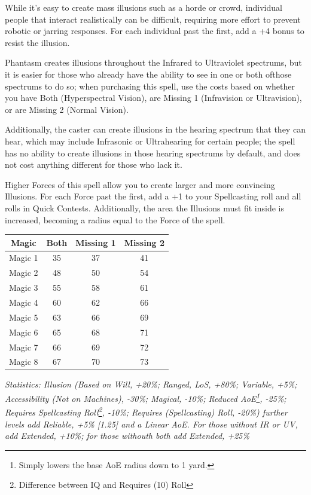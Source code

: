 \begin{multicols}{3}
	While it's easy to create mass illusions such as a horde or crowd, individual people that interact realistically can be difficult, requiring more effort to prevent robotic or jarring responses. For each individual past the first, add a +4 bonus to resist the illusion.
	
	Phantasm creates illusions throughout the Infrared to Ultraviolet spectrums, but it is easier for those who already have the ability to see in one or both ofthose spectrums to do so; when purchasing this spell, use the costs based on whether you have Both (Hyperspectral Vision), are Missing 1 (Infravision or Ultravision), or are Missing 2 (Normal Vision). 
	
	Additionally, the caster can create illusions in the hearing spectrum that they can hear, which may include Infrasonic or Ultrahearing for certain people; the spell has no ability to create illusions in those hearing spectrums by default, and does not cost anything different for those who lack it.
	
	Higher Forces of this spell allow you to create larger and more convincing Illusions. For each Force past the first, add a +1 to your Spellcasting roll and all rolls in Quick Contests. Additionally, the area the Illusions must fit inside is increased, becoming a radius equal to the Force of the spell.
	
	\begin{center}
		\begin{adjustwidth}{-2.5mm}{}
		\begin{tabular}{|c|c|c|c|}
			\hline
			Magic & Both & Missing 1 & Missing 2 \\
			\hline
			\hline
			Magic 1 & 35 & 37 & 41 \\
			Magic 2 & 48 & 50 & 54 \\
			Magic 3 & 55 & 58 & 61 \\
			Magic 4 & 60 & 62 & 66 \\
			Magic 5 & 63 & 66 & 69 \\
			Magic 6 & 65 & 68 & 71 \\
			Magic 7 & 66 & 69 & 72 \\
			Magic 8 & 67 & 70 & 73 \\
			\hline
		\end{tabular}
		\end{adjustwidth}
	\end{center}	
	
	\textcolor{OliveGreen}{\textit{Statistics: Illusion (Based on Will, +20\%; Ranged, LoS, +80\%; Variable, +5\%; Accessibility (Not on Machines), -30\%; Magical, -10\%; Reduced AoE\footnote{Simply lowers the base AoE radius down to 1 yard.}, -25\%; Requires Spellcasting Roll\footnote{Difference between IQ and Requires (10) Roll}, -10\%; Requires (Spellcasting) Roll, -20\%) further levels add Reliable, +5\% [1.25] and a Linear AoE. For those without IR or UV, add Extended, +10\%; for those withouth both add Extended, +25\%}}
	

\end{multicols}
